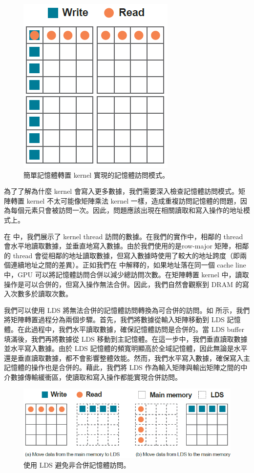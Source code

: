 \begin{figure}[h]
    \centering
    \includegraphics[width=0.4\linewidth]{FileAusiliari/Screenshots/Figure8-9.png}
    \caption{簡單記憶體轉置 kernel 實現的記憶體訪問模式。}
    \label{fig:transpose}
\end{figure}

為了了解為什麼 kernel 會寫入更多數據，我們需要深入檢查記憶體訪問模式。矩陣轉置 kernel 不太可能像矩陣乘法 kernel 一樣，造成重複訪問記憶體的問題，因為每個元素只會被訪問一次。因此，問題應該出現在相關讀取和寫入操作的地址模式上。

在  中，我們展示了 kernel thread 訪問的數據。在我們的實作中，相鄰的 thread 會水平地讀取數據，並垂直地寫入數據。由於我們使用的是row-major 矩陣，相鄰的 thread 會從相鄰的地址讀取數據，但寫入數據時使用了較大的地址跨度（即兩個連續地址之間的差異）。正如我們在   中解釋的，如果地址落在同一個 cache line 中，GPU 可以將記憶體訪問合併以減少總訪問次數。在矩陣轉置 kernel 中，讀取操作是可以合併的，但寫入操作無法合併。因此，我們自然會觀察到 DRAM 的寫入次數多於讀取次數。

我們可以使用 LDS 將無法合併的記憶體訪問轉換為可合併的訪問。如  所示，我們將矩陣轉置過程分為兩個步驟。首先，我們將數據從輸入矩陣移動到 LDS 記憶體。在此過程中，我們水平讀取數據，確保記憶體訪問是合併的。當 LDS buffer 填滿後，我們再將數據從 LDS 移動到主記憶體。在這一步中，我們垂直讀取數據並水平寫入數據。由於 LDS 記憶體的頻寬明顯高於全域記憶體，因此無論是水平還是垂直讀取數據，都不會影響整體效能。然而，我們水平寫入數據，確保寫入主記憶體的操作也是合併的。藉此，我們將 LDS 作為輸入矩陣與輸出矩陣之間的中介數據傳輸緩衝區，使讀取和寫入操作都能實現合併訪問。

\begin{figure}[h]
    \centering
    \includegraphics[width=0.8\linewidth]{FileAusiliari/Screenshots/Figure8-10.png}
    \caption{使用 LDS 避免非合併記憶體訪問。}
    \label{fig:lds}
\end{figure}

